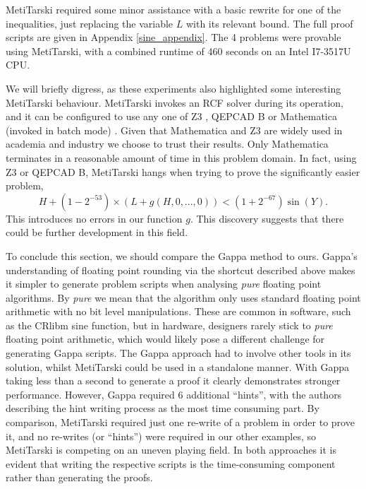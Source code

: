 \documentclass{fac}
\begin{document}
MetiTarski required some minor assistance with a basic rewrite for one of the inequalities, just replacing the variable $L$ with its relevant bound. The full proof scripts are given in Appendix \ref{sine_appendix}. The 4 problems were provable using MetiTarski, with a combined runtime of 460 seconds on an Intel I7-3517U CPU. 

We will briefly digress, as these experiments also highlighted some interesting MetiTarski behaviour. MetiTarski invokes an RCF solver during its operation, and it can be configured to use any one of Z3 \cite{de2008z3}, QEPCAD B \cite{brown2003qepcad} or Mathematica (invoked in batch mode) \cite{Mathematica}. Given that Mathematica and Z3 are widely used in academia and industry we choose to trust their results. Only Mathematica terminates in a reasonable amount of time in this problem domain. In fact, using Z3 or QEPCAD B, MetiTarski hangs when trying to prove the significantly easier problem,
\begin{equation}
    H + (1-2^{-53})\times(L+g(H,0,...,0)) < (1+2^{-67})\sin{(Y)}.
\end{equation}
This introduces no errors in our function $g$. This discovery suggests that there could be further development in this field. 

To conclude this section, we should compare the Gappa method to ours. Gappa's understanding of floating point rounding via the shortcut described above makes it simpler to generate problem scripts when analysing \textit{pure} floating point algorithms. By \textit{pure} we mean that the algorithm only uses standard floating point arithmetic with no bit level manipulations. These are common in software, such as the CRlibm sine function, but in hardware, designers rarely stick to \textit{pure} floating point arithmetic, which would likely pose a different challenge for generating Gappa scripts. The Gappa approach had to involve other tools in its solution, whilst MetiTarski could be used in a standalone manner. With Gappa taking less than a second to generate a proof it clearly demonstrates stronger performance. However, Gappa required 6 additional ``hints'', with the authors describing the hint writing process as the most time consuming part. By comparison, MetiTarski required just one re-write of a problem in order to prove it, and no re-writes (or ``hints'') were required in our other examples, so MetiTarski is competing on an uneven playing field. In both approaches it is evident that writing the respective scripts is the time-consuming component rather than generating the proofs.
\end{document}
